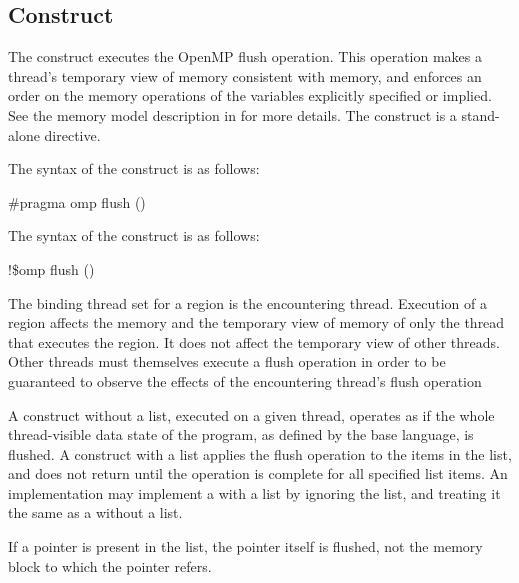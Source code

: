 \subsection{ Construct}
\label{subsec:flush Construct}
\summary
The  construct executes the OpenMP flush operation. This operation makes a 
thread’s temporary view of memory consistent with memory, and enforces an order on 
the memory operations of the variables explicitly specified or implied. See the memory 
model description in  for more details. The  construct is a 
stand-alone directive.

\syntax
\ccppspecificstart
The syntax of the  construct is as follows:

\begin{boxedcode}
\#pragma omp flush \plc{[}()\plc{] new-line}
\end{boxedcode}
\ccppspecificend

\fortranspecificstart
The syntax of the  construct is as follows:

\begin{boxedcode}
!\$omp flush \plc{[}()\plc{]}
\end{boxedcode}
\fortranspecificend

\binding
The binding thread set for a  region is the encountering thread. Execution of a 
 region affects the memory and the temporary view of memory of only the thread 
that executes the region. It does not affect the temporary view of other threads. Other 
threads must themselves execute a flush operation in order to be guaranteed to observe 
the effects of the encountering thread’s flush operation

\descr
A  construct without a list, executed on a given thread, operates as if the whole 
thread-visible data state of the program, as defined by the base language, is flushed. A 
 construct with a list applies the flush operation to the items in the list, and does 
not return until the operation is complete for all specified list items. An implementation 
may implement a  with a list by ignoring the list, and treating it the same as a 
 without a list.

\ccppspecificstart
If a pointer is present in the list, the pointer itself is flushed, not the memory block to 
which the pointer refers.
\ccppspecificend

